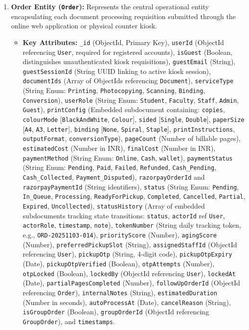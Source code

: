 \documentclass[12pt,a4paper]{report}
\begin{document}
\begin{enumerate}[leftmargin=0.35in, itemsep=4pt]
  \item \textbf{Order Entity (\texttt{Order}):}
  Represents the central operational entity encapsulating each document processing requisition submitted through the online web application or physical counter kiosk.
  \begin{itemize}[leftmargin=0.25in, itemsep=2pt]
    \item \textbf{Key Attributes:} \texttt{\_id} (ObjectId, Primary Key), \texttt{userId} (ObjectId referencing \texttt{User}, required for registered accounts), \texttt{isGuest} (Boolean, distinguishes unauthenticated kiosk requisitions), \texttt{guestEmail} (String), \texttt{guestSessionId} (String UUID linking to active kiosk session), \texttt{documentIds} (Array of ObjectIds referencing \texttt{Document}), \texttt{serviceType} (String Enum: \texttt{Printing}, \texttt{Photocopying}, \texttt{Scanning}, \texttt{Binding}, \texttt{Conversion}), \texttt{userRole} (String Enum: \texttt{Student}, \texttt{Faculty}, \texttt{Staff}, \texttt{Admin}, \texttt{Guest}), \texttt{printConfig} (Embedded subdocument containing: \texttt{copies}, \texttt{colourMode} [\texttt{BlackAndWhite}, \texttt{Colour}], \texttt{sided} [\texttt{Single}, \texttt{Double}], \texttt{paperSize} [\texttt{A4}, \texttt{A3}, \texttt{Letter}], \texttt{binding} [\texttt{None}, \texttt{Spiral}, \texttt{Staple}], \texttt{printInstructions}, \texttt{outputFormat}, \texttt{conversionType}), \texttt{pageCount} (Number of billable pages), \texttt{estimatedCost} (Number in INR), \texttt{finalCost} (Number in INR), \texttt{paymentMethod} (String Enum: \texttt{Online}, \texttt{Cash}, \texttt{wallet}), \texttt{paymentStatus} (String Enum: \texttt{Pending}, \texttt{Paid}, \texttt{Failed}, \texttt{Refunded}, \texttt{Cash\_Pending}, \texttt{Cash\_Collected}, \texttt{Payment\_Disputed}), \texttt{razorpayOrderId} and \texttt{razorpayPaymentId} (String identifiers), \texttt{status} (String Enum: \texttt{Pending}, \texttt{In\_Queue}, \texttt{Processing}, \texttt{ReadyForPickup}, \texttt{Completed}, \texttt{Cancelled}, \texttt{Partial}, \texttt{Expired}, \texttt{Uncollected}), \texttt{statusHistory} (Array of embedded subdocuments tracking state transitions: \texttt{status}, \texttt{actorId} ref \texttt{User}, \texttt{actorRole}, \texttt{timestamp}, \texttt{note}), \texttt{tokenNumber} (String daily tracking token, e.g., \texttt{ORD-20251103-014}), \texttt{priorityScore} (Number), \texttt{agingScore} (Number), \texttt{preferredPickupSlot} (String), \texttt{assignedStaffId} (ObjectId referencing \texttt{User}), \texttt{pickupOtp} (String, 4-digit code), \texttt{pickupOtpExpiry} (Date), \texttt{pickupOtpVerified} (Boolean), \texttt{otpAttempts} (Number), \texttt{otpLocked} (Boolean), \texttt{lockedBy} (ObjectId referencing \texttt{User}), \texttt{lockedAt} (Date), \texttt{partialPagesCompleted} (Number), \texttt{followUpOrderId} (ObjectId referencing \texttt{Order}), \texttt{internalNotes} (String), \texttt{estimatedDuration} (Number in seconds), \texttt{autoProcessAt} (Date), \texttt{cancelReason} (String), \texttt{isGroupOrder} (Boolean), \texttt{groupOrderId} (ObjectId referencing \texttt{GroupOrder}), and \texttt{timestamps}.
  \end{itemize}


\end{enumerate}
\end{document}
